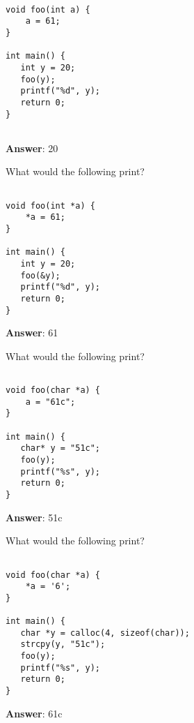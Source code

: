 \begin{solution}
\begin{blocksection}

\begin{verbatim}

void foo(int a) {
    a = 61;
}

int main() {
   int y = 20;
   foo(y);
   printf("%d", y);
   return 0;
}


\end{verbatim}

\end{blocksection}
\textbf{Answer}: 20


\question What would the following print?

\begin{blocksection}

\begin{verbatim}

void foo(int *a) {
    *a = 61;
}

int main() {
   int y = 20;
   foo(&y);
   printf("%d", y);
   return 0;
}

\end{verbatim}

\end{blocksection}
\textbf{Answer}: 61

\pagebreak
\question What would the following print?

\begin{blocksection}

\begin{verbatim}

void foo(char *a) {
    a = "61c";
}

int main() {
   char* y = "51c";
   foo(y);
   printf("%s", y);
   return 0;
}

\end{verbatim}

\end{blocksection}
\textbf{Answer}: 51c


\question What would the following print?

\begin{blocksection}

\begin{verbatim}

void foo(char *a) {
    *a = '6';
}

int main() {
   char *y = calloc(4, sizeof(char));
   strcpy(y, "51c");
   foo(y);
   printf("%s", y);
   return 0;
}

\end{verbatim}

\end{blocksection}
\textbf{Answer}: 61c
\end{solution}





